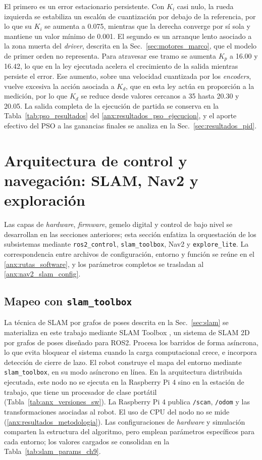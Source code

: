 El primero es un error estacionario persistente. Con $K_i$ casi nulo, la rueda
izquierda se estabiliza un escalón de cuantización por debajo de la
referencia, por lo que su $K_i$ se aumenta a 0.075, mientras que la derecha
converge por sí sola y mantiene un valor mínimo de 0.001. El segundo es un arranque lento asociado a la
zona muerta del \textit{driver}, descrita en la Sec.~\ref{sec:motores_marco}, que el
modelo de primer orden no representa. Para atravesar ese tramo se aumenta
$K_p$ a 16.00 y 16.42, lo que en la ley ejecutada acelera el crecimiento de la
salida mientras persiste el error. Ese aumento, sobre una velocidad cuantizada por los \textit{encoders},
vuelve excesiva la acción asociada a $K_d$, que en esta ley actúa en
proporción a la medición, por lo que $K_d$ se reduce desde valores cercanos a
35 hasta 20.30 y 20.05. La salida completa de la
ejecución de partida se conserva en la Tabla~\ref{tab:pso_resultados} del
\ref{anx:resultados_pso_ejecucion}, y el aporte efectivo del PSO a las
ganancias finales se analiza en la Sec.~\ref{sec:resultados_pid}.

\section{Arquitectura de control y navegación: SLAM, Nav2 y exploración}
\label{chap:app_control_nav}

Las capas de \textit{hardware}, \textit{firmware}, gemelo digital y control de bajo nivel se desarrollan en las secciones anteriores; esta sección enfatiza la orquestación de los subsistemas mediante \texttt{ros2\_control}, \texttt{slam\_toolbox}, Nav2 y \texttt{explore\_lite}. La correspondencia entre archivos de configuración, entorno y función se reúne en el \ref{anx:rutas_software}, y los parámetros completos se trasladan al \ref{anx:nav2_slam_config}.

\subsection{Mapeo con \texttt{slam\_toolbox}}
\label{sec:slam_ch9}

La técnica de SLAM por grafos de poses descrita en la Sec.~\ref{sec:slam} se
materializa en este trabajo mediante SLAM Toolbox
\citep{macenski2021slamtoolbox}, un sistema de SLAM 2D por grafos de poses
diseñado para \gls{ROS2}. Procesa los barridos de forma asíncrona, lo que
evita bloquear el sistema cuando la carga computacional crece, e incorpora
detección de cierre de lazo.
El robot construye el mapa del entorno mediante \texttt{slam\_toolbox}, en su modo asíncrono en línea. En la arquitectura distribuida ejecutada, este nodo no se ejecuta en la Raspberry Pi 4 sino en la estación de trabajo, que tiene un procesador de clase portátil (Tabla~\ref{tab:anx_versiones_sw}). La Raspberry Pi 4 publica \texttt{/scan}, \texttt{/odom} y las transformaciones asociadas al robot. El uso de CPU del nodo no se mide (\ref{anx:resultados_metodologia}).
Las configuraciones de \textit{hardware} y simulación comparten la estructura del
algoritmo, pero emplean parámetros específicos para cada entorno; los valores
cargados se consolidan en la Tabla~\ref{tab:slam_params_ch9}.

